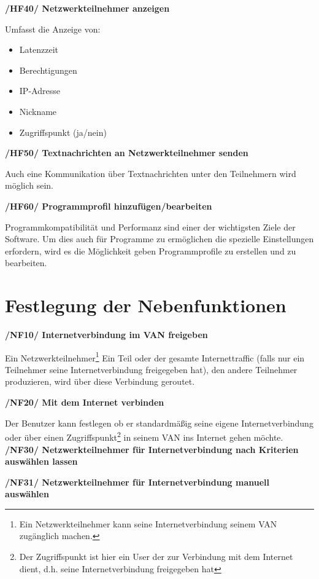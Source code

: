 \documentclass[a4paper,12pt]{scrreprt}
\begin{document}
		
		\textbf { /HF40/ Netzwerkteilnehmer anzeigen
		}
				
		Umfasst die Anzeige von:
		\begin{itemize}
		
	
		\item Latenzzeit
		\item Berechtigungen
		\item IP-Adresse
		\item Nickname
		\item Zugriffspunkt (ja/nein)\\
			\end{itemize}
		
		
		
		
		
		\textbf {/HF50/ Textnachrichten an Netzwerkteilnehmer senden}
		
		
		Auch eine Kommunikation über Textnachrichten unter den Teilnehmern wird möglich sein.
		
		 \textbf {/HF60/ Programmprofil hinzufügen/bearbeiten}
		
		Programmkompatibilität und Performanz sind einer der wichtigsten Ziele der Software. Um dies auch für Programme zu ermöglichen die spezielle Einstellungen erfordern, wird es die Möglichkeit geben Programmprofile zu erstellen und zu bearbeiten.
		
	\section{Festlegung der Nebenfunktionen}
	\textbf { /NF10/ Internetverbindung im VAN freigeben} 
			
			Ein Netzwerkteilnehmer\footnote{Ein Netzwerkteilnehmer kann seine Internetverbindung seinem VAN zugänglich machen.} Ein Teil oder der gesamte Internettraffic (falls nur ein Teilnehmer seine Internetverbindung freigegeben hat), den andere Teilnehmer produzieren, wird über diese Verbindung geroutet.
			
	\textbf {/NF20/ Mit dem Internet verbinden} 
			
	Der Benutzer kann festlegen ob er standardmäßig seine eigene Internetverbindung oder über einen Zugriffspunkt\footnote{Der Zugriffspunkt ist hier ein User der zur Verbindung mit dem Internet dient, d.h. seine Internetverbindung freigegeben hat} in seinem VAN ins Internet gehen möchte.
	\textbf {/NF30/ Netzwerkteilnehmer für Internetverbindung nach Kriterien auswählen lassen}
	
	
   	\textbf {/NF31/ Netzwerkteilnehmer für Internetverbindung manuell auswählen}
	
\end{document}

